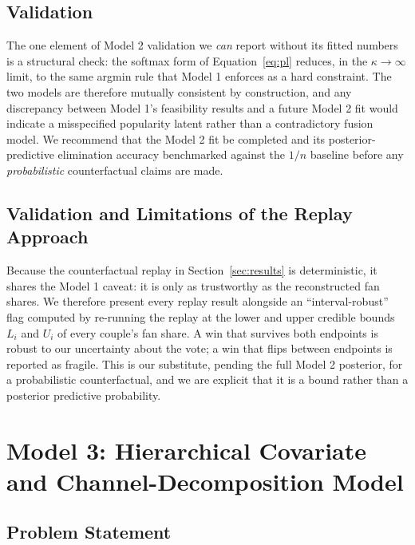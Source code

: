 \documentclass{article}
\begin{document}
\subsection{Validation}

The one element of Model 2 validation we \emph{can} report without its fitted numbers is a
structural check: the softmax form of Equation~\eqref{eq:pl} reduces, in the
$\kappa\to\infty$ limit, to the same argmin rule that Model 1 enforces as a hard
constraint. The two models are therefore mutually consistent by construction, and any
discrepancy between Model 1's feasibility results and a future Model 2 fit would indicate a
misspecified popularity latent rather than a contradictory fusion model. We recommend that
the Model 2 fit be completed and its posterior-predictive elimination accuracy benchmarked
against the $1/n$ baseline before any \emph{probabilistic} counterfactual claims are made.


\subsection{Validation and Limitations of the Replay Approach}

Because the counterfactual replay in Section~\ref{sec:results} is deterministic, it shares
the Model 1 caveat: it is only as trustworthy as the reconstructed fan shares. We therefore
present every replay result alongside an ``interval-robust'' flag computed by re-running the
replay at the lower and upper credible bounds $L_i$ and $U_i$ of every couple's fan share.
A win that survives both endpoints is robust to our uncertainty about the vote; a win that
flips between endpoints is reported as fragile. This is our substitute, pending the full
Model 2 posterior, for a probabilistic counterfactual, and we are explicit that it is a
bound rather than a posterior predictive probability.

\section{Model 3: Hierarchical Covariate and Channel-Decomposition Model}\label{sec:m3}

\subsection{Problem Statement}
\end{document}
